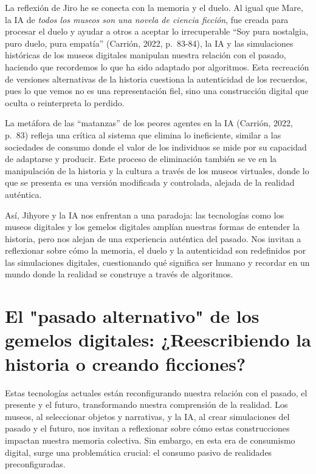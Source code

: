 \documentclass[
  spanish,
  11pt,
  a4paper,
]{scrbook}
\begin{document}
La reflexión de Jiro he se conecta con la memoria y el duelo. Al igual
que Mare, la IA de \emph{todos los museos son una novela de ciencia
ficción}, fue creada para procesar el duelo y ayudar a otros a aceptar
lo irrecuperable ``Soy pura nostalgia, puro duelo, pura empatía''
(Carrión, 2022, p.~83-84), la IA y las simulaciones históricas de los
museos digitales manipulan nuestra relación con el pasado, haciendo que
recordemos lo que ha sido adaptado por algoritmos. Esta recreación de
versiones alternativas de la historia cuestiona la autenticidad de los
recuerdos, pues lo que vemos no es una representación fiel, sino una
construcción digital que oculta o reinterpreta lo perdido.

La metáfora de las ``matanzas'' de los peores agentes en la IA (Carrión,
2022, p.~83) refleja una crítica al sistema que elimina lo ineficiente,
similar a las sociedades de consumo donde el valor de los individuos se
mide por su capacidad de adaptarse y producir. Este proceso de
eliminación también se ve en la manipulación de la historia y la cultura
a través de los museos virtuales, donde lo que se presenta es una
versión modificada y controlada, alejada de la realidad auténtica.

Así, Jihyore y la IA nos enfrentan a una paradoja: las tecnologías como
los museos digitales y los gemelos digitales amplían nuestras formas de
entender la historia, pero nos alejan de una experiencia auténtica del
pasado. Nos invitan a reflexionar sobre cómo la memoria, el duelo y la
autenticidad son redefinidos por las simulaciones digitales,
cuestionando qué significa ser humano y recordar en un mundo donde la
realidad se construye a través de algoritmos.

\section*{El "pasado alternativo" de los gemelos digitales:
¿Reescribiendo la historia o creando
ficciones?}\label{el-pasado-alternativo-de-los-gemelos-digitales-reescribiendo-la-historia-o-creando-ficciones}


Estas tecnologías actuales están reconfigurando nuestra relación con el
pasado, el presente y el futuro, transformando nuestra comprensión de la
realidad. Los museos, al seleccionar objetos y narrativas, y la IA, al
crear simulaciones del pasado y el futuro, nos invitan a reflexionar
sobre cómo estas construcciones impactan nuestra memoria colectiva. Sin
embargo, en esta era de consumismo digital, surge una problemática
crucial: el consumo pasivo de realidades preconfiguradas.
\end{document}
